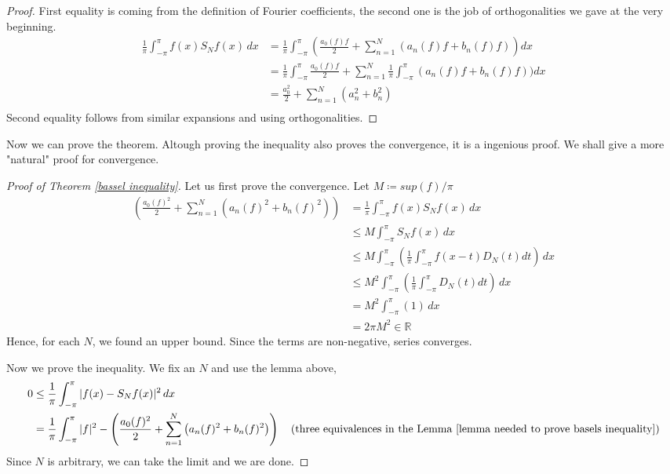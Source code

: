\documentclass[12pt]{amsart}
\theoremstyle{definition}
\begin{document}
 \begin{proof}
 First equality is coming from the definition of Fourier coefficients, the second one is the job of orthogonalities we gave at the very beginning.
 \[
 \begin{aligned}
     \frac{1}{\pi} \int_{-\pi}^{\pi} f(x)S_Nf(x) \, dx
         &= \frac{1}{\pi} \int_{-\pi}^{\pi} (\frac{a_0(f)f}{2} + \sum_{n=1}^{N} \left(a_n(f)f +
         b_n(f)f\right))dx \\
         &= \frac{1}{\pi} \int_{-\pi}^{\pi}\frac{a_0(f)f}{2} + \sum_{n=1}^{N} \frac{1}{\pi} \int_{-\pi}^{\pi} \left(a_n(f)f +
         b_n(f)f\right))dx \\
         &= \frac{a_0^2}{2} + \sum_{n=1}^{N} \left(a_n^2 +
         b_n^2\right)\\
 \end{aligned}
 \]
 Second equality follows from similar expansions and using orthogonalities. \qedhere

 \end{proof}


    Now we can prove the theorem. Altough proving the inequality also proves the convergence, it is a ingenious proof. We shall give a more "natural" proof for convergence.


    \begin{proof}[Proof of Theorem \ref{bassel inequality}]
        Let us first prove the convergence. Let $M \coloneqq sup(f)/{\pi}$
        \[
        \begin{aligned}
            (\frac{a_0(f)^2}{2} + \sum_{n=1}^{N} \left(a_n(f)^2 +
         b_n(f)^2\right))
         &=  \frac{1}{\pi} \int_{-\pi}^{\pi} f(x)S_Nf(x) \, dx \\
         &\leq M \int_{-\pi}^{\pi}S_Nf(x) \, dx \\
         &\leq M \int_{-\pi}^{\pi}(\frac{1}{\pi} \int_{-\pi}^{\pi}f(x-t)D_N(t)dt) \, dx \\
         &\leq M^2  \int_{-\pi}^{\pi}(\frac{1}{\pi} \int_{-\pi}^{\pi}D_N(t)dt) \, dx \\
         &= M^2  \int_{-\pi}^{\pi}(1) \, dx \\
         &= 2\pi M^2 \in \mathbb{R}
        \end{aligned}
        \]
        Hence, for each $N$, we found an upper bound. Since the terms are non-negative, series converges.

        Now we prove the inequality.
        We fix an $N$ and use the lemma above,
        \[
        \begin{aligned}
            0
            &\leq \frac{1}{\pi} \int_{-\pi}^{\pi} |f(x)-S_Nf(x)|^2 \, dx \\
            &= \frac{1}{\pi} \int_{-\pi}^{\pi}|f|^2 - \left( \frac{a_0(f)^2}{2} + \sum_{n=1}^{N} \left(a_n(f)^2 + b_n(f)^2\right) \right) \quad \text{(three equivalences in the Lemma \ref{lemma needed to prove basels inequality})}
        \end{aligned}
        \]
        Since $N$ is arbitrary, we can take the limit and we are done.
    \end{proof}
\end{document}
